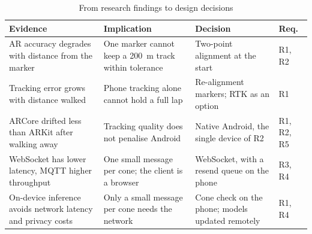 \begin{table}[!t]
\caption{From research findings to design decisions}
\label{tab:decisions}
\centering
\footnotesize
\setlength{\tabcolsep}{3pt}
\renewcommand{\arraystretch}{1.12}
\begin{tabular}{|L{0.27\columnwidth}|L{0.27\columnwidth}|L{0.27\columnwidth}|L{0.08\columnwidth}|}
\hline
\textbf{Evidence} & \textbf{Implication} & \textbf{Decision} & \textbf{Req.} \\ \hline
AR accuracy degrades with distance from the marker~\cite{chalhoub2019} & One marker cannot keep a 200~m track within tolerance & Two-point alignment at the start & R1, R2 \\ \hline
Tracking error grows with distance walked~\cite{feigl2020} & Phone tracking alone cannot hold a full lap & Re-alignment markers; RTK as an option~\cite{jiang2023} & R1 \\ \hline
ARCore drifted less than ARKit after walking away~\cite{scargill2021} & Tracking quality does not penalise Android & Native Android, the single device of R2 & R1, R2, R5 \\ \hline
WebSocket has lower latency, MQTT higher throughput~\cite{ajayi2023} & One small message per cone; the client is a browser & WebSocket, with a resend queue on the phone & R3, R4 \\ \hline
On-device inference avoids network latency and privacy costs~\cite{chen2019} & Only a small message per cone needs the network & Cone check on the phone; models updated remotely & R1, R4 \\ \hline
\end{tabular}
\end{table}
